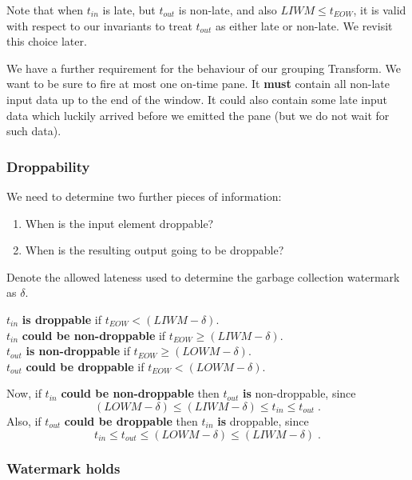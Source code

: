 Note that when $t_{\mathit{in}}$ is late, but $t_{\mathit{out}}$ is non-late, and also $\mathit{LIWM} \leq t_{\mathit{EOW}}$, it is valid with respect to our invariants to treat $t_{\mathit{out}}$ as either late or non-late.
We revisit this choice later.

We have a further requirement for the behaviour of our grouping Transform.
We want to be sure to fire at most one on-time pane.
It \textbf{must} contain all non-late input data up to the end of the window.
It could also contain some late input data which luckily arrived before we emitted the pane (but we do not wait for such data).

\subsubsection{Droppability}

We need to determine two further pieces of information:
\begin{enumerate}
	\item When is the input element droppable?
	\item When is the resulting output going to be droppable?
\end{enumerate}

Denote the allowed lateness used to determine the garbage collection watermark as $\delta$.

$t_{\mathit{in}}$ \textbf{is droppable} if $t_{\mathit{EOW}} < (\mathit{LIWM} - \delta)$.\\
$t_{\mathit{in}}$ \textbf{could be non-droppable} if $t_{\mathit{EOW}} \geq (\mathit{LIWM} - \delta)$.\\
$t_{\mathit{out}}$ \textbf{is non-droppable} if $t_{\mathit{EOW}} \geq (\mathit{LOWM} - \delta)$.\\
$t_{\mathit{out}}$ \textbf{could be droppable} if $t_{\mathit{EOW}} < (\mathit{LOWM} - \delta)$.

Now, if $t_{\mathit{in}}$ \textbf{could be non-droppable} then $t_{\mathit{out}}$ \textbf{is} non-droppable, since \[(\mathit{LOWM} - \delta) \leq (\mathit{LIWM} - \delta) \leq t_{\mathit{in}} \leq t_{\mathit{out}}\;\text{.}\]
Also, if $t_{\mathit{out}}$ \textbf{could be droppable} then $t_{\mathit{in}}$ \textbf{is} droppable, since \[t_{\mathit{in}} \leq t_{\mathit{out}} \leq (\mathit{LOWM} - \delta) \leq (\mathit{LIWM} - \delta)\;\text{.}\]

\subsubsection{Watermark holds}

